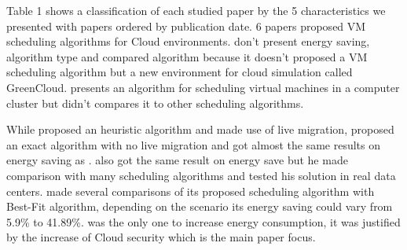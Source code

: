 \documentclass{article}
\begin{document}
Table 1 shows a classification of each studied paper by the 5 characteristics we presented with papers ordered by publication date. 6 papers proposed VM scheduling algorithms for Cloud environments. \cite{Dzmitry} don't present energy saving, algorithm type and compared algorithm because it doesn't proposed a VM scheduling algorithm but a new environment for cloud simulation called GreenCloud. \cite{Gregor} presents an algorithm for scheduling virtual machines in a computer cluster but didn't compares it to other scheduling algorithms.  

While \cite{bli:2009} proposed an heuristic algorithm and made use of live migration, \cite{Andrew} proposed an exact algorithm with no live migration and got almost the same results on energy saving as \cite{bli:2009}. \cite{Beloglazov} also got the same result on energy save but he made comparison with many scheduling algorithms and tested his solution in real data centers. \cite{Ghribi} made several comparisons of its proposed scheduling algorithm with Best-Fit algorithm, depending on the scenario its energy saving could vary from 5.9\% to 41.89\%. \cite{Farhad} was the only one to increase energy consumption, it was justified by the increase of Cloud security which is the main paper focus. 













\end{document}
